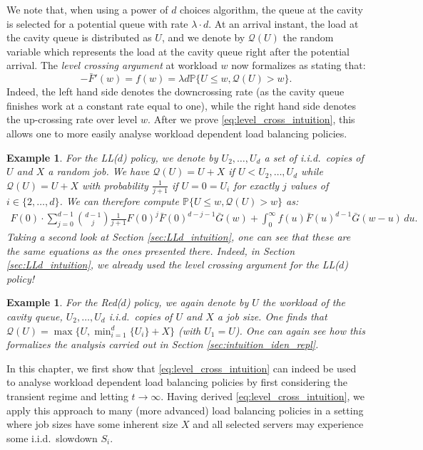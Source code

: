 \documentclass[12pt]{report}
\newtheorem{vbd}[theorem]{Example}
\begin{document}
We note that, when using a power of $d$ choices algorithm, the queue at the cavity is selected for a potential queue with rate $\lambda \cdot d$. At an arrival instant, the load at the cavity queue is distributed as $U$, and we denote by $\mathcal{Q}(U)$ the random variable which represents the load at the cavity queue right after the potential arrival. The \textit{level crossing argument} at workload $w$ now formalizes as stating that:
\begin{equation} \label{eq:level_cross_intuition}
-\bar F'(w) = f(w) = \lambda d \mathbb{P}\{ U \leq w, \mathcal{Q}(U) > w \}.
\end{equation}
Indeed, the left hand side denotes the downcrossing rate (as the cavity queue finishes work at a constant rate equal to one), while the right hand side denotes the up-crossing rate over level $w$. After we prove \eqref{eq:level_cross_intuition}, this allows one to more easily analyse workload dependent load balancing policies.
\begin{vbd}
For the LL($d$) policy, we denote by $U_2,\dots,U_d$ a set of i.i.d.~copies of $U$ and $X$ a random job. We have $\mathcal{Q}(U) = U + X$ if $U < U_2, \dots, U_d$ while $\mathcal{Q}(U) =U+X$ with probability $\frac{1}{j+1}$ if $U = 0 = U_i$ for exactly $j$ values of $i \in \{2,\dots,d\}$. We can therefore compute $\mathbb{P}\{ U \leq w, \mathcal{Q}(U) > w \}$ as:
\begin{align*}
	F(0) \cdot \sum_{j=0}^{d-1} \binom{d-1}{j} \frac{1}{j+1} F(0)^j \bar F(0)^{d-j-1} \bar G(w) + \int_0^\infty f(u) \bar F(u)^{d-1} \bar G(w-u) \, du.
\end{align*}
Taking a second look at Section \ref{sec:LLd_intuition}, one can see that these are the same equations as the ones presented there. Indeed, in Section \ref{sec:LLd_intuition}, we already used the level crossing argument for the LL($d$) policy!
\end{vbd}

\begin{vbd}
	For the Red($d$) policy, we again denote by $U$ the workload of the cavity queue, $U_2,\dots, U_d$ i.i.d.~copies of $U$ and $X$ a job size. One finds that $\mathcal{Q}(U) = \max\{U, \min_{i=1}^d \{ U_i\} + X\}$ (with $U_1 = U$). One can again see how this formalizes the analysis carried out in  Section \ref{sec:intuition_iden_repl}.
\end{vbd}

In this chapter, we first show that \eqref{eq:level_cross_intuition} can indeed be used to analyse workload dependent load balancing policies by first considering the transient regime and letting $t\rightarrow \infty$. Having derived \eqref{eq:level_cross_intuition}, we apply this approach to many (more advanced) load balancing policies in a setting where job sizes have some inherent size $X$ and all selected servers may experience some i.i.d.~slowdown $S_i$.
\end{document}
